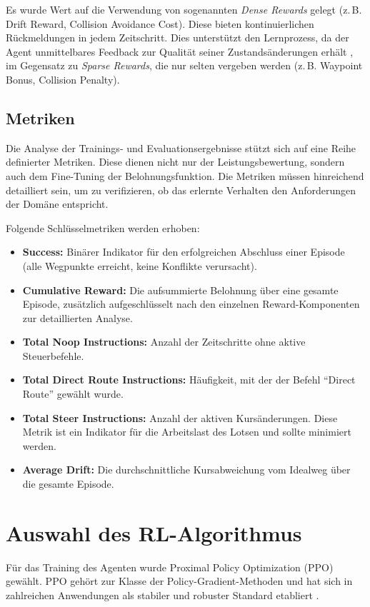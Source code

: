 Es wurde Wert auf die Verwendung von sogenannten \emph{Dense Rewards} gelegt (z.\,B. Drift Reward, Collision Avoidance Cost). Diese bieten kontinuierlichen Rückmeldungen in jedem Zeitschritt. 
Dies unterstützt den Lernprozess, da der Agent unmittelbares Feedback zur Qualität seiner Zustandsänderungen erhält \cite[Kap. 17.4]{sutton2018rl}, im Gegensatz zu \emph{Sparse Rewards}, die nur selten vergeben werden (z.\,B. Waypoint Bonus, Collision Penalty).

\subsection{Metriken}
\label{sc:env_metrics}
Die Analyse der Trainings\hyp{} und Evaluationsergebnisse stützt sich auf eine Reihe definierter Metriken. Diese dienen nicht nur der Leistungsbewertung, sondern auch dem Fine\hyp{}Tuning der Belohnungsfunktion.
Die Metriken müssen hinreichend detailliert sein, um zu verifizieren, ob das erlernte Verhalten den Anforderungen der Domäne entspricht.
\medskip

Folgende Schlüsselmetriken werden erhoben:
\begin{itemize}
    \item \textbf{Success:} Binärer Indikator für den erfolgreichen Abschluss einer Episode (alle Wegpunkte erreicht, keine Konflikte verursacht).
    \item \textbf{Cumulative Reward:} Die aufsummierte Belohnung über eine gesamte Episode, zusätzlich aufgeschlüsselt nach den einzelnen Reward\hyp{}Komponenten zur detaillierten Analyse.
    \item \textbf{Total Noop Instructions:} Anzahl der Zeitschritte ohne aktive Steuerbefehle.
    \item \textbf{Total Direct Route Instructions:} Häufigkeit, mit der der Befehl \enquote{Direct Route} gewählt wurde.
    \item \textbf{Total Steer Instructions:} Anzahl der aktiven Kursänderungen. Diese Metrik ist ein Indikator für die Arbeitslast des Lotsen und sollte minimiert werden.
    \item \textbf{Average Drift:} Die durchschnittliche Kursabweichung vom Idealweg über die gesamte Episode.
\end{itemize}

\section{Auswahl des RL\hyp{}Algorithmus}
Für das Training des Agenten wurde Proximal Policy Optimization (\ac{PPO}) gewählt.
\ac{PPO} gehört zur Klasse der Policy\hyp{}Gradient\hyp{}Methoden und hat sich in zahlreichen Anwendungen als stabiler und robuster Standard etabliert \cite{OriginalPPO}.
\medskip

